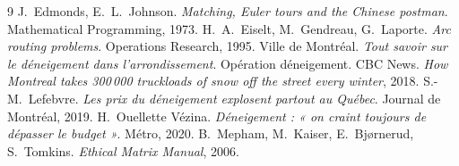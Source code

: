 \documentclass[11pt,a4paper]{article}
\begin{document}
\begin{thebibliography}{9}\small
{} J.~Edmonds, E.~L.~Johnson. \emph{Matching, Euler tours and
the Chinese postman}. Mathematical Programming, 1973.
 H.~A.~Eiselt, M.~Gendreau, G.~Laporte. \emph{Arc routing
problems}. Operations Research, 1995.
 Ville de Montréal. \emph{Tout savoir sur le déneigement dans
l'arrondissement}. Opération déneigement.
 CBC News. \emph{How Montreal takes 300\,000 truckloads of snow
off the street every winter}, 2018.
 S.-M.~Lefebvre. \emph{Les prix du déneigement explosent partout
au Québec}. Journal de Montréal, 2019.
 H.~Ouellette Vézina. \emph{Déneigement : « on craint toujours
de dépasser le budget »}. Métro, 2020.
 B.~Mepham, M.~Kaiser, E.~Bjørnerud, S.~Tomkins.
\emph{Ethical Matrix Manual}, 2006.
\end{thebibliography}
\end{document}
